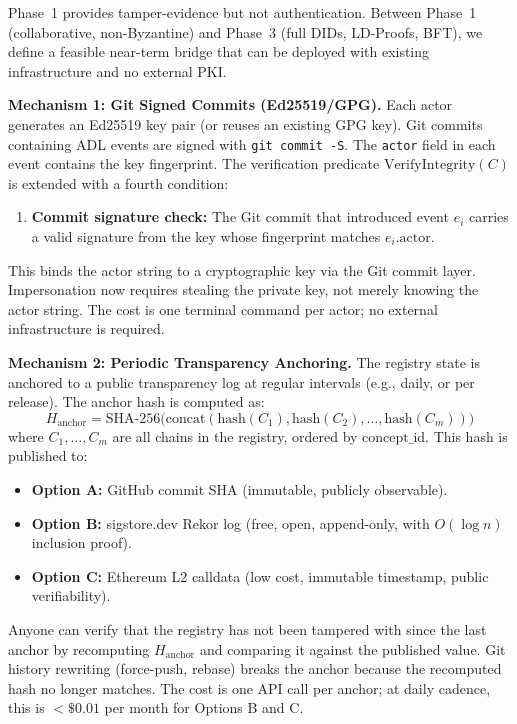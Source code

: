 Phase~1 provides tamper-evidence but not authentication. Between Phase~1 (collaborative, non-Byzantine) and Phase~3 (full DIDs, LD-Proofs, BFT), we define a feasible near-term bridge that can be deployed with existing infrastructure and no external PKI.

\textbf{Mechanism 1: Git Signed Commits (Ed25519/GPG).} Each actor generates an Ed25519 key pair (or reuses an existing GPG key). Git commits containing ADL events are signed with \texttt{git commit -S}. The \texttt{actor} field in each event contains the key fingerprint. The verification predicate $\text{VerifyIntegrity}(C)$ is extended with a fourth condition:
\begin{enumerate}[label=(4)]
    \item \textbf{Commit signature check:} The Git commit that introduced event $e_i$ carries a valid signature from the key whose fingerprint matches $e_i.\text{actor}$.
\end{enumerate}
This binds the actor string to a cryptographic key via the Git commit layer. Impersonation now requires stealing the private key, not merely knowing the actor string. The cost is one terminal command per actor; no external infrastructure is required.

\textbf{Mechanism 2: Periodic Transparency Anchoring.} The registry state is anchored to a public transparency log at regular intervals (e.g., daily, or per release). The anchor hash is computed as:
\begin{equation}
    H_{\text{anchor}} = \text{SHA-256}\bigl(\text{concat}(\text{hash}(C_1), \text{hash}(C_2), \ldots, \text{hash}(C_m))\bigr)
\end{equation}
where $C_1, \ldots, C_m$ are all chains in the registry, ordered by $\text{concept\_id}$. This hash is published to:
\begin{itemize}[leftmargin=2em]
    \item \textbf{Option A:} GitHub commit SHA (immutable, publicly observable).
    \item \textbf{Option B:} sigstore.dev Rekor log (free, open, append-only, with $O(\log n)$ inclusion proof).
    \item \textbf{Option C:} Ethereum L2 calldata (low cost, immutable timestamp, public verifiability).
\end{itemize}
Anyone can verify that the registry has not been tampered with since the last anchor by recomputing $H_{\text{anchor}}$ and comparing it against the published value. Git history rewriting (force-push, rebase) breaks the anchor because the recomputed hash no longer matches. The cost is one API call per anchor; at daily cadence, this is $<\$0.01$ per month for Options B and C.

